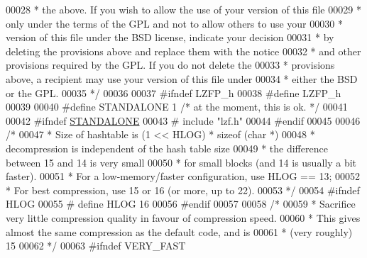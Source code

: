 \begin{DoxyCode}
00028 \textcolor{comment}{ * the above. If you wish to allow the use of your version of this file}
00029 \textcolor{comment}{ * only under the terms of the GPL and not to allow others to use your}
00030 \textcolor{comment}{ * version of this file under the BSD license, indicate your decision}
00031 \textcolor{comment}{ * by deleting the provisions above and replace them with the notice}
00032 \textcolor{comment}{ * and other provisions required by the GPL. If you do not delete the}
00033 \textcolor{comment}{ * provisions above, a recipient may use your version of this file under}
00034 \textcolor{comment}{ * either the BSD or the GPL.}
00035 \textcolor{comment}{ */}
00036 
00037 \textcolor{preprocessor}{#}\textcolor{preprocessor}{ifndef} \textcolor{preprocessor}{LZFP\_h}
00038 \textcolor{preprocessor}{#}\textcolor{preprocessor}{define} \textcolor{preprocessor}{LZFP\_h}
00039 
00040 \textcolor{preprocessor}{#}\textcolor{preprocessor}{define} \textcolor{preprocessor}{STANDALONE} 1 \textcolor{comment}{/* at the moment, this is ok. */}
00041 
00042 \textcolor{preprocessor}{#}\textcolor{preprocessor}{ifndef} \hyperlink{lzfP_8h_ab1c59581eafa11e55bf8f6ea8b877dd6}{STANDALONE}
00043 \textcolor{preprocessor}{#} \textcolor{preprocessor}{include} \textcolor{stringliteral}{"lzf.h"}
00044 \textcolor{preprocessor}{#}\textcolor{preprocessor}{endif}
00045 
00046 \textcolor{comment}{/*}
00047 \textcolor{comment}{ * Size of hashtable is (1 << HLOG) * sizeof (char *)}
00048 \textcolor{comment}{ * decompression is independent of the hash table size}
00049 \textcolor{comment}{ * the difference between 15 and 14 is very small}
00050 \textcolor{comment}{ * for small blocks (and 14 is usually a bit faster).}
00051 \textcolor{comment}{ * For a low-memory/faster configuration, use HLOG == 13;}
00052 \textcolor{comment}{ * For best compression, use 15 or 16 (or more, up to 22).}
00053 \textcolor{comment}{ */}
00054 \textcolor{preprocessor}{#}\textcolor{preprocessor}{ifndef} \textcolor{preprocessor}{HLOG}
00055 \textcolor{preprocessor}{#} \textcolor{preprocessor}{define} \textcolor{preprocessor}{HLOG} 16
00056 \textcolor{preprocessor}{#}\textcolor{preprocessor}{endif}
00057 
00058 \textcolor{comment}{/*}
00059 \textcolor{comment}{ * Sacrifice very little compression quality in favour of compression speed.}
00060 \textcolor{comment}{ * This gives almost the same compression as the default code, and is}
00061 \textcolor{comment}{ * (very roughly) 15%
00062 \textcolor{comment}{ */}
00063 \textcolor{preprocessor}{#}\textcolor{preprocessor}{ifndef} \textcolor{preprocessor}{VERY\_FAST}
}
\end{DoxyCode}
